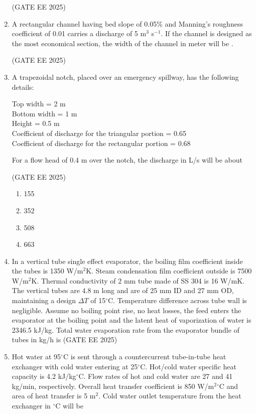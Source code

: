 \documentclass[journal,12pt,onecolumn]{IEEEtran}
\theoremstyle{remark}
\begin{document}
\begin{enumerate}
\hfill(GATE EE 2025)

\item A rectangular channel having bed slope of 0.05\% and Manning's roughness coefficient of 0.01 carries a discharge of 5 m$^3$ s$^{-1}$. If the channel is designed as the most economical section, the width of the channel in meter will be \underline{\hspace{2cm}}. 

\hfill(GATE EE 2025)

\item A trapezoidal notch, placed over an emergency spillway, has the following details:  

Top width = 2 m  \\
Bottom width = 1 m  \\
Height = 0.5 m  \\
Coefficient of discharge for the triangular portion = 0.65\\  
Coefficient of discharge for the rectangular portion = 0.68 

For a flow head of 0.4 m over the notch, the discharge in L/s will be about 

\hfill(GATE EE 2025)
\begin{multicols}{4}
    \begin{enumerate}
        \item 155
        \item 352
        \item 508
        \item 663
    \end{enumerate}
\end{multicols}

\item In a vertical tube single effect evaporator, the boiling film coefficient inside the tubes is 1350 W/m$^2$K. Steam condensation film coefficient outside is 7500 W/m$^2$K. Thermal conductivity of 2 mm tube made of SS 304 is 16 W/mK. The vertical tubes are 4.8 m long and are of 25 mm ID and 27 mm OD, maintaining a design $\Delta T$ of 15$^\circ$C. Temperature difference across tube wall is negligible. Assume no boiling point rise, no heat losses, the feed enters the evaporator at the boiling point and the latent heat of vaporization of water is 2346.5 kJ/kg. Total water evaporation rate from the evaporator bundle of tubes in kg/h is \underline{\hspace{2cm}}\hfill(GATE EE 2025)
\item Hot water at 95$^\circ$C is sent through a countercurrent tube-in-tube heat exchanger with cold water entering at 25$^\circ$C. Hot/cold water specific heat capacity is 4.2 kJ/kg$^\circ$C. Flow rates of hot and cold water are 27 and 41 kg/min, respectively. Overall heat transfer coefficient is 850 W/m$^2$$^\circ$C and area of heat transfer is 5 m$^2$. Cold water outlet temperature from the heat exchanger in $^\circ$C will be\underline{\hspace{2cm}}


\end{enumerate}
\end{document}
